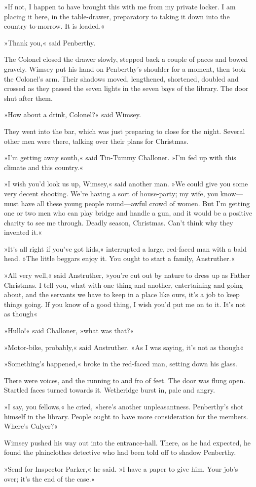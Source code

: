 »If not, I happen to have brought this with me from my private locker. I am placing it here, in the table-drawer, preparatory to taking it down into the country to-morrow. It is loaded.«

»Thank you,« said Penberthy.

The Colonel closed the drawer slowly, stepped back a couple of paces and bowed gravely. Wimsey put his hand on Penberthy's shoulder for a moment, then took the Colonel's arm. Their shadows moved, lengthened, shortened, doubled and crossed as they passed the seven lights in the seven bays of the library. The door shut after them.

»How about a drink, Colonel?« said Wimsey.

They went into the bar, which was just preparing to close for the night. Several other men were there, talking over their plans for Christmas.

»I'm getting away south,« said Tin-Tummy Challoner. »I'm fed up with this climate and this country.«

»I wish you'd look us up, Wimsey,« said another man. »We could give you some very decent shooting. We're having a sort of house-party; my wife, you know—must have all these young people round—awful crowd of women. But I'm getting one or two men who can play bridge and handle a gun, and it would be a positive charity to see me through. Deadly season, Christmas. Can't think why they invented it.«

»It's all right if you've got kids,« interrupted a large, red-faced man with a bald head. »The little beggars enjoy it. You ought to start a family, Anstruther.«

»All very well,« said Anstruther, »you're cut out by nature to dress up as Father Christmas. I tell you, what with one thing and another, entertaining and going about, and the servants we have to keep in a place like ours, it's a job to keep things going. If you know of a good thing, I wish you'd put me on to it. It's not as though\longdash«

»Hullo!« said Challoner, »what was that?«

»Motor-bike, probably,« said Anstruther. »As I was saying, it's not as though\longdash«

»Something's happened,« broke in the red-faced man, setting down his glass.

There were voices, and the running to and fro of feet. The door was flung open. Startled faces turned towards it. Wetheridge burst in, pale and angry.

»I say, you fellows,« he cried, »here's another unpleasantness. Penberthy's shot himself in the library. People ought to have more consideration for the members. Where's Culyer?«

Wimsey pushed his way out into the entrance-hall. There, as he had expected, he found the plainclothes detective who had been told off to shadow Penberthy.

»Send for Inspector Parker,« he said. »I have a paper to give him. Your job's over; it's the end of the case.«